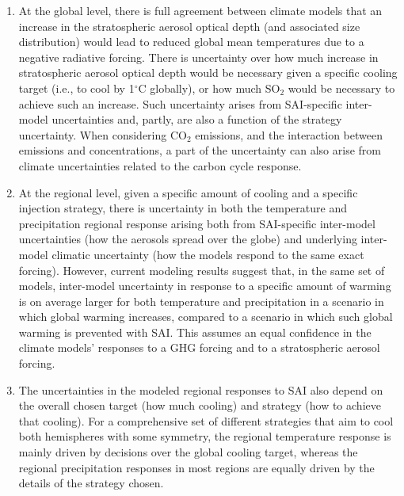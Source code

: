 \documentclass[draft]{agujournal2019}
\begin{document}
\begin{enumerate}
    \item At the global level, there is full agreement between climate models that an increase in the stratospheric aerosol optical depth (and associated size distribution) would lead to reduced global mean temperatures due to a negative radiative forcing. There is uncertainty over how much increase in stratospheric aerosol optical depth would be necessary given a specific cooling target (i.e., to cool by 1$^{\circ}$C globally), or how much SO$_2$ would be necessary to achieve such an increase. Such uncertainty arises from SAI-specific inter-model uncertainties and, partly, are also a function of the strategy uncertainty. When considering CO$_2$ emissions, and the interaction between emissions and concentrations, a part of the uncertainty can also arise from climate uncertainties related to the carbon cycle response.
    \item At the regional level, given a specific amount of cooling and a specific injection strategy, there is uncertainty in both the temperature and precipitation regional response arising both from SAI-specific inter-model uncertainties (how the aerosols spread over the globe) and underlying inter-model climatic uncertainty (how the models respond to the same exact forcing). However, current modeling results suggest that, in the same set of models, inter-model uncertainty in response to a specific amount of warming is on average larger for both temperature and precipitation in a scenario in which global warming increases, compared to a scenario in which such global warming is prevented with SAI. This assumes an equal confidence in the climate models' responses to a GHG forcing and to a stratospheric aerosol forcing.
    \item The uncertainties in the modeled regional responses to SAI also depend on the overall chosen target (how much cooling) and strategy (how to achieve that cooling). For a comprehensive set of different strategies that aim to cool both hemispheres with some symmetry, the regional temperature response is mainly driven by decisions over the global cooling target, whereas the regional precipitation responses in most regions are equally driven by the details of the strategy chosen.
\end{enumerate}
\end{document}
